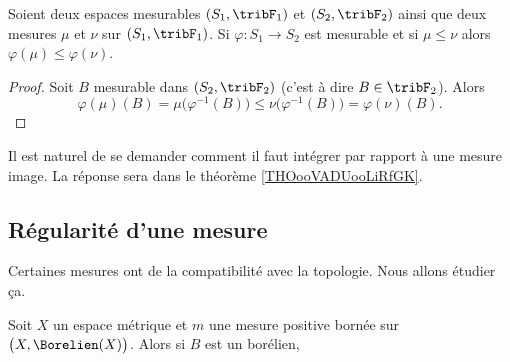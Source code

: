 \begin{lemma}
    Soient deux espaces mesurables \( (S_1,\tribF_1)\) et \( (S_2,\tribF_2)\) ainsi que deux mesures \( \mu\) et \( \nu\) sur \( (S_1,\tribF_1)\). Si \( \varphi\colon S_1\to S_2\) est mesurable et si \( \mu\leq \nu\) alors \( \varphi(\mu)\leq \varphi(\nu)\).
\end{lemma}

\begin{proof}
    Soit \( B\) mesurable dans \( (S_2,\tribF_2)\) (c'est à dire \( B\in \tribF_2\)). Alors
    \begin{equation}
        \varphi(\mu)(B)=\mu\big( \varphi^{-1}(B) \big)\leq\nu\big( \varphi^{-1}(B) \big)=\varphi(\nu)(B).
    \end{equation}
\end{proof}

Il est naturel de se demander comment il faut intégrer par rapport à une mesure image. La réponse sera dans le théorème \ref{THOooVADUooLiRfGK}.

\subsection{Régularité d'une mesure}

Certaines mesures ont de la compatibilité avec la topologie. Nous allons étudier ça.

\begin{theorem}     \label{ThoPKGEooVrpsGU}
    Soit \( X\) un espace métrique et \( m\) une mesure positive bornée sur \( \big(X,\Borelien(X)\big)\). Alors si \( B\) est un borélien,
\end{theorem}

